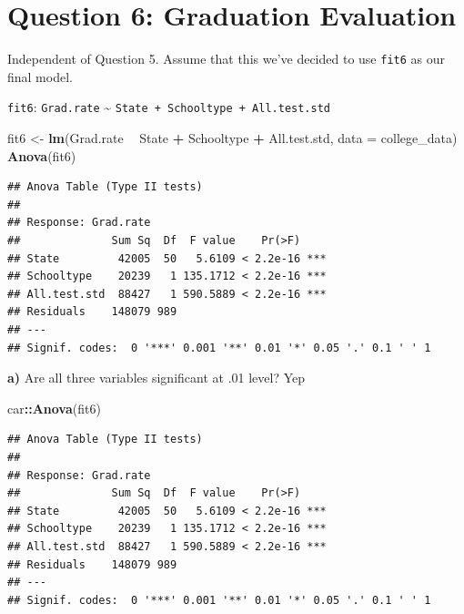 \documentclass[]{article}
\newenvironment{Shaded}{\begin{snugshade}}{\end{snugshade}}
\newcommand{\KeywordTok}[1]{\textcolor[rgb]{0.13,0.29,0.53}{\textbf{#1}}}
\newcommand{\DataTypeTok}[1]{\textcolor[rgb]{0.13,0.29,0.53}{#1}}
\newcommand{\StringTok}[1]{\textcolor[rgb]{0.31,0.60,0.02}{#1}}
\newcommand{\OperatorTok}[1]{\textcolor[rgb]{0.81,0.36,0.00}{\textbf{#1}}}
\newcommand{\NormalTok}[1]{#1}
\begin{document}
\section{Question 6: Graduation
Evaluation}\label{question-6-graduation-evaluation}

Independent of Question 5. Assume that this we've decided to use
\texttt{fit6} as our final model.

\texttt{fit6}: \texttt{Grad.rate} \textasciitilde{}
\texttt{State\ +\ Schooltype\ +\ All.test.std}

\begin{Shaded}
\begin{Highlighting}[]
\NormalTok{fit6 <-}\StringTok{ }\KeywordTok{lm}\NormalTok{(Grad.rate }\OperatorTok{~}\StringTok{ }\NormalTok{State }\OperatorTok{+}\StringTok{ }\NormalTok{Schooltype }\OperatorTok{+}\StringTok{ }\NormalTok{All.test.std, }\DataTypeTok{data =}\NormalTok{ college_data)}
\KeywordTok{Anova}\NormalTok{(fit6)}
\end{Highlighting}
\end{Shaded}

\begin{verbatim}
## Anova Table (Type II tests)
## 
## Response: Grad.rate
##              Sum Sq  Df  F value    Pr(>F)    
## State         42005  50   5.6109 < 2.2e-16 ***
## Schooltype    20239   1 135.1712 < 2.2e-16 ***
## All.test.std  88427   1 590.5889 < 2.2e-16 ***
## Residuals    148079 989                       
## ---
## Signif. codes:  0 '***' 0.001 '**' 0.01 '*' 0.05 '.' 0.1 ' ' 1
\end{verbatim}

\textbf{a)} Are all three variables significant at .01 level? Yep

\begin{Shaded}
\begin{Highlighting}[]
\NormalTok{car}\OperatorTok{::}\KeywordTok{Anova}\NormalTok{(fit6)}
\end{Highlighting}
\end{Shaded}

\begin{verbatim}
## Anova Table (Type II tests)
## 
## Response: Grad.rate
##              Sum Sq  Df  F value    Pr(>F)    
## State         42005  50   5.6109 < 2.2e-16 ***
## Schooltype    20239   1 135.1712 < 2.2e-16 ***
## All.test.std  88427   1 590.5889 < 2.2e-16 ***
## Residuals    148079 989                       
## ---
## Signif. codes:  0 '***' 0.001 '**' 0.01 '*' 0.05 '.' 0.1 ' ' 1
\end{verbatim}
\end{document}

